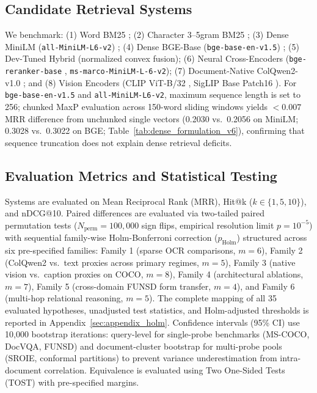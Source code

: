 \subsection{Candidate Retrieval Systems}
We benchmark: (1) Word BM25 \cite{robertson2009bm25}; (2) Character 3--5gram BM25 \cite{mcnamee2004character}; (3) Dense MiniLM (\texttt{all-MiniLM-L6-v2}) \cite{reimers2019sbert}; (4) Dense BGE-Base (\texttt{bge-base-en-v1.5}) \cite{xiao2023bge}; (5) Dev-Tuned Hybrid (normalized convex fusion); (6) Neural Cross-Encoders (\texttt{bge-reranker-base} \cite{xiao2023bge}, \texttt{ms-marco-MiniLM-L-6-v2}); (7) Document-Native ColQwen2-v1.0 \cite{faysse2024colqwen2}; and (8) Vision Encoders (CLIP ViT-B/32 \cite{radford2021clip}, SigLIP Base Patch16 \cite{zhai2023siglip}). For \texttt{bge-base-en-v1.5} and \texttt{all-MiniLM-L6-v2}, maximum sequence length is set to 256; chunked MaxP evaluation across 150-word sliding windows yields $<0.007$ MRR difference from unchunked single vectors (0.2030 vs.\ 0.2056 on MiniLM; 0.3028 vs.\ 0.3022 on BGE; Table~\ref{tab:dense_formulation_v6}), confirming that sequence truncation does not explain dense retrieval deficits.

\subsection{Evaluation Metrics and Statistical Testing}
Systems are evaluated on Mean Reciprocal Rank (MRR), Hit@k ($k \in \{1, 5, 10\}$), and nDCG@10. Paired differences are evaluated via two-tailed paired permutation tests ($N_{\text{perm}}=100{,}000$ sign flips, empirical resolution limit $p = 10^{-5}$) with sequential family-wise Holm-Bonferroni correction ($p_{\text{Holm}}$) structured across six pre-specified families: Family 1 (sparse OCR comparisons, $m=6$), Family 2 (ColQwen2 vs.\ text proxies across primary regimes, $m=5$), Family 3 (native vision vs.\ caption proxies on COCO, $m=8$), Family 4 (architectural ablations, $m=7$), Family 5 (cross-domain FUNSD form transfer, $m=4$), and Family 6 (multi-hop relational reasoning, $m=5$). The complete mapping of all 35 evaluated hypotheses, unadjusted test statistics, and Holm-adjusted thresholds is reported in Appendix~\ref{sec:appendix_holm}. Confidence intervals (95\% CI) use 10,000 bootstrap iterations: query-level for single-probe benchmarks (MS-COCO, DocVQA, FUNSD) and document-cluster bootstrap for multi-probe pools (SROIE, conformal partitions) to prevent variance underestimation from intra-document correlation. Equivalence is evaluated using Two One-Sided Tests (TOST) with pre-specified margins.

